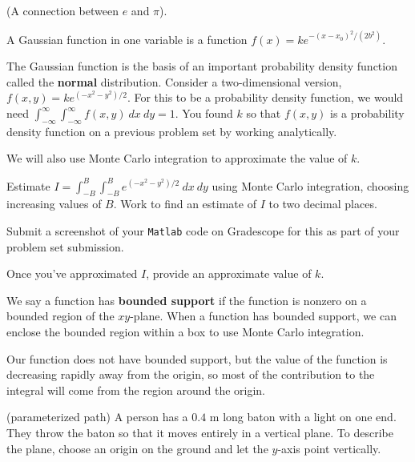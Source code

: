 \documentclass[12pt,letterpaper,noanswers]{exam}
\begin{document}
\begin{questions}
\question (A connection between $e$ and $\pi$).  

A Gaussian function in one variable is a function $f(x) = ke^{-(x-x_0)^2/(2b^2)}$.  

 The Gaussian function is the basis of an important probability density function called the \textbf{normal} distribution.   Consider a two-dimensional version, $f(x,y) = k e^{(-x^2-y^2)/2}$.  For this to be a probability density function, we would need $\int_{-\infty}^\infty\int_{-\infty}^\infty f(x,y)\ dx\ dy = 1$.    You found $k$ so that $f(x,y)$ is a probability density function on a previous problem set by working analytically.


We will also use Monte Carlo integration to approximate the value of $k$.  


\begin{parts}
    \item
Estimate $\displaystyle I = \int_{-B}^B\int_{-B}^B e^{(-x^2-y^2)/2}\ dx\ dy$ using Monte Carlo integration, choosing increasing values of $B$.  Work to find an estimate of $I$ to two decimal places.

\item
Submit a screenshot of your \texttt{Matlab} code on Gradescope for this as part of your problem set submission.

\item Once you've approximated $I$, provide an approximate value of $k$.

We say a function has \textbf{bounded support} if the function is nonzero on a bounded region of the $xy$-plane.  When a function has bounded support, we can enclose the bounded region within a box to use Monte Carlo integration.

Our function does not have bounded support, but the value of the function is decreasing rapidly away from the origin, so most of the contribution to the integral will come from the region around the origin.

\end{parts}





\question (parameterized path) A person has a $0.4$ m long baton with a light on one end.  They throw the baton so that it moves entirely in a vertical plane.  To describe the plane, choose an origin on the ground and let the $y$-axis point vertically.


\end{questions}
\end{document}
